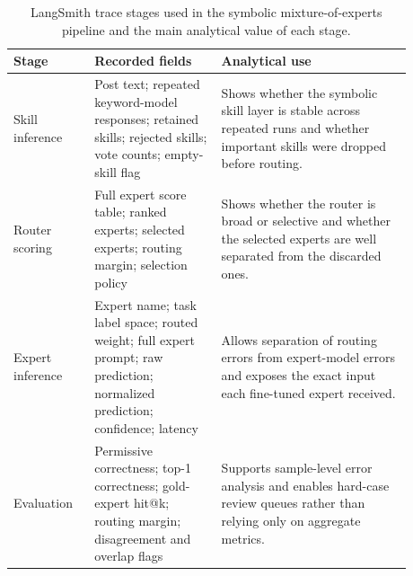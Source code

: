 \begin{table}[t]
\centering
\small
\begin{tabular}{p{0.17\linewidth} p{0.29\linewidth} p{0.42\linewidth}}
\hline
Stage & Recorded fields & Analytical use \\
\hline
Skill inference &
Post text; repeated keyword-model responses; retained skills; rejected skills; vote counts; empty-skill flag &
Shows whether the symbolic skill layer is stable across repeated runs and whether important skills were dropped before routing. \\
Router scoring &
Full expert score table; ranked experts; selected experts; routing margin; selection policy &
Shows whether the router is broad or selective and whether the selected experts are well separated from the discarded ones. \\
Expert inference &
Expert name; task label space; routed weight; full expert prompt; raw prediction; normalized prediction; confidence; latency &
Allows separation of routing errors from expert-model errors and exposes the exact input each fine-tuned expert received. \\
Evaluation &
Permissive correctness; top-1 correctness; gold-expert hit@k; routing margin; disagreement and overlap flags &
Supports sample-level error analysis and enables hard-case review queues rather than relying only on aggregate metrics. \\
\hline
\end{tabular}
\caption{LangSmith trace stages used in the symbolic mixture-of-experts pipeline and the main analytical value of each stage.}
\label{tab:langsmith_trace_stages}
\end{table}
